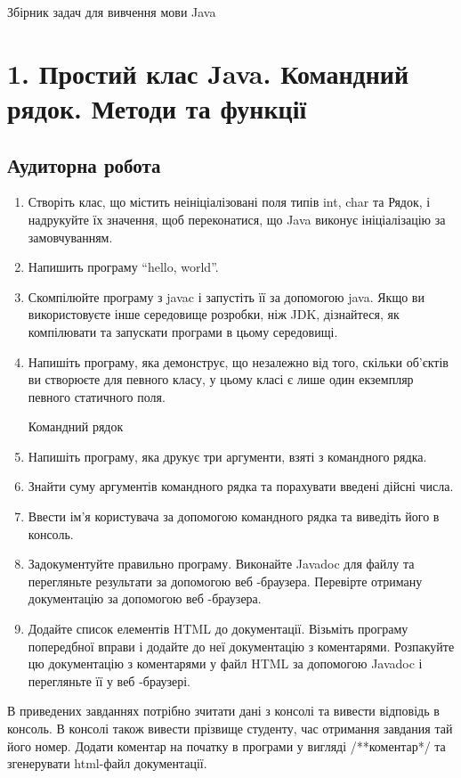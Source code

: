 \documentclass[]{article}
\date{}
\begin{document}
Збірник задач для вивчення мови Java


\section{1. Простий клас Java. Командний рядок. Методи та функції}

\subsection{Аудиторна робота}
\setcounter{subsection}{1}

\begin{enumerate}
\def\labelenumi{1.\arabic{enumi}.}
\item
Створіть клас, що містить неініціалізовані поля типів int, char та Рядок, і надрукуйте їх значення, щоб переконатися, що Java виконує ініціалізацію за замовчуванням.
\item
Напишить програму “hello, world”. 
\item
Скомпілюйте програму з javac і запустіть її за допомогою java. Якщо ви використовуєте інше середовище розробки, ніж JDK, дізнайтеся, як компілювати та запускати програми в цьому середовищі.
 \item
Напишіть програму, яка демонструє, що незалежно від того, скільки об’єктів ви створюєте для певного класу, у цьому класі є лише один екземпляр певного статичного поля.

Командний рядок
\item
Напишіть програму, яка друкує три аргументи, взяті з командного рядка.
\item
Знайти суму аргументів командного рядка та порахувати введені дійсні числа.
\item
Ввести ім'я користувача за допомогою командного рядка та виведіть його в консоль.

\item
Задокументуйте правильно програму. Виконайте Javadoc для файлу та перегляньте результати за допомогою веб -браузера.
Перевірте отриману документацію за допомогою веб -браузера.
\item
 Додайте список елементів HTML до документації.
Візьміть програму попередбної вправи і додайте до неї документацію з коментарями. Розпакуйте цю документацію з коментарями у файл HTML за допомогою Javadoc і перегляньте її у веб -браузері.
\end{enumerate}

В приведених завданнях потрібно зчитати дані з консолі та вивести відповідь в консоль. В консолі також вивести прізвище студенту, час отримання завдания тай його номер. Додати коментар на початку в програми у вигляді /**коментар*/ та згенерувати html-файл документації. 
\end{document}
